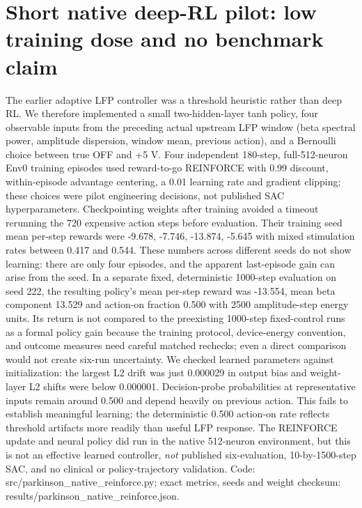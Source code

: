 \section{Short native deep-RL pilot: low training dose and no benchmark claim}
The earlier adaptive LFP controller was a threshold heuristic rather than deep RL. We therefore implemented a small two-hidden-layer tanh policy, four observable inputs from the preceding actual upstream LFP window (beta spectral power, amplitude dispersion, window mean, previous action), and a Bernoulli choice between true OFF and +5 V. Four independent 180-step, full-512-neuron Env0 training episodes used reward-to-go REINFORCE with 0.99 discount, within-episode advantage centering, a 0.01 learning rate and gradient clipping; these choices were pilot engineering decisions, not published SAC hyperparameters. Checkpointing weights after training avoided a timeout rerunning the 720 expensive action steps before evaluation. Their training seed mean per-step rewards were -9.678, -7.746, -13.874, -5.645 with mixed stimulation rates between 0.417 and 0.544. These numbers across different seeds do not show learning: there are only four episodes, and the apparent last-episode gain can arise from the seed. In a separate fixed, deterministic 1000-step evaluation on seed 222, the resulting policy's mean per-step reward was -13.554, mean beta component 13.529 and action-on fraction 0.500 with 2500 amplitude-step energy units. Its return is not compared to the preexisting 1000-step fixed-control runs as a formal policy gain because the training protocol, device-energy convention, and outcome measures need careful matched rechecks; even a direct comparison would not create six-run uncertainty. We checked learned parameters against initialization: the largest L2 drift was just 0.000029 in output bias and weight-layer L2 shifts were below 0.000001. Decision-probe probabilities at representative inputs remain around 0.500 and depend heavily on previous action. This fails to establish meaningful learning; the deterministic 0.500 action-on rate reflects threshold artifacts more readily than useful LFP response. The REINFORCE update and neural policy did run in the native 512-neuron environment, but this is not an effective learned controller, \emph{not} published six-evaluation, 10-by-1500-step SAC, and no clinical or policy-trajectory validation. Code: src/parkinson\_native\_reinforce.py; exact metrics, seeds and weight checksum: results/parkinson\_native\_reinforce.json.

